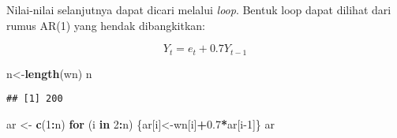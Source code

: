 \documentclass[
]{article}
\newenvironment{Shaded}{\begin{snugshade}}{\end{snugshade}}
\newcommand{\ControlFlowTok}[1]{\textcolor[rgb]{0.13,0.29,0.53}{\textbf{#1}}}
\newcommand{\DecValTok}[1]{\textcolor[rgb]{0.00,0.00,0.81}{#1}}
\newcommand{\FloatTok}[1]{\textcolor[rgb]{0.00,0.00,0.81}{#1}}
\newcommand{\FunctionTok}[1]{\textcolor[rgb]{0.13,0.29,0.53}{\textbf{#1}}}
\newcommand{\NormalTok}[1]{#1}
\newcommand{\OtherTok}[1]{\textcolor[rgb]{0.56,0.35,0.01}{#1}}
\newcommand{\SpecialCharTok}[1]{\textcolor[rgb]{0.81,0.36,0.00}{\textbf{#1}}}
\begin{document}
Nilai-nilai selanjutnya dapat dicari melalui \emph{loop}. Bentuk loop
dapat dilihat dari rumus AR(1) yang hendak dibangkitkan:

\[ Y_t = e_t+0.7Y_{t-1} \]

\begin{Shaded}
\begin{Highlighting}[]
\NormalTok{n}\OtherTok{\textless{}{-}}\FunctionTok{length}\NormalTok{(wn)}
\NormalTok{n}
\end{Highlighting}
\end{Shaded}

\begin{verbatim}
## [1] 200
\end{verbatim}

\begin{Shaded}
\begin{Highlighting}[]
\NormalTok{ar }\OtherTok{\textless{}{-}} \FunctionTok{c}\NormalTok{(}\DecValTok{1}\SpecialCharTok{:}\NormalTok{n) }
\ControlFlowTok{for}\NormalTok{ (i }\ControlFlowTok{in} \DecValTok{2}\SpecialCharTok{:}\NormalTok{n) \{ar[i]}\OtherTok{\textless{}{-}}\NormalTok{wn[i]}\SpecialCharTok{+}\FloatTok{0.7}\SpecialCharTok{*}\NormalTok{ar[i}\DecValTok{{-}1}\NormalTok{]\}}
\NormalTok{ar}
\end{Highlighting}
\end{Shaded}
\end{document}
